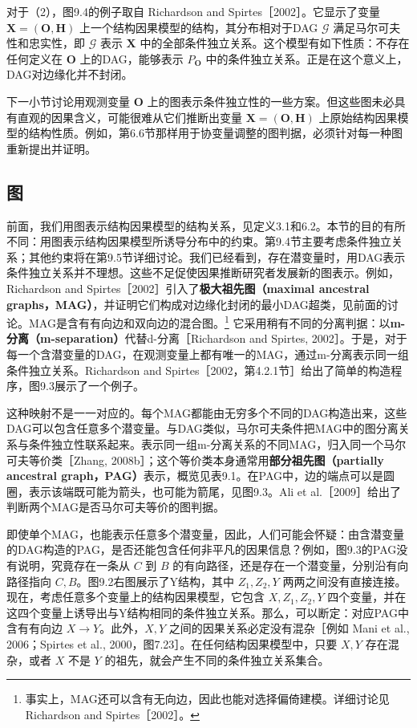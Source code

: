 


对于（2），图9.4的例子取自 Richardson and Spirtes［2002］。它显示了变量 $\mathbf X=(\mathbf O,\mathbf H)$ 上一个结构因果模型的结构，其分布相对于DAG $\mathcal G$ 满足马尔可夫性和忠实性，即 $\mathcal G$ 表示 $\mathbf X$ 中的全部条件独立关系。这个模型有如下性质：不存在任何定义在 $\mathbf O$ 上的DAG，能够表示 $P_{\mathbf O}$ 中的条件独立关系。正是在这个意义上，DAG对边缘化并不封闭。

下一小节讨论用观测变量 $\mathbf O$ 上的图表示条件独立性的一些方案。但这些图未必具有直观的因果含义，可能很难从它们推断出变量 $\mathbf X=(\mathbf O,\mathbf H)$ 上原始结构因果模型的结构性质。例如，第6.6节那样用于协变量调整的图判据，必须针对每一种图重新提出并证明。

\subsection{图}

前面，我们用图表示结构因果模型的结构关系，见定义3.1和6.2。本节的目的有所不同：用图表示结构因果模型所诱导分布中的约束。第9.4节主要考虑条件独立关系；其他约束将在第9.5节详细讨论。我们已经看到，存在潜变量时，用DAG表示条件独立关系并不理想。这些不足促使因果推断研究者发展新的图表示。例如，Richardson and Spirtes［2002］引入了\textbf{极大祖先图（maximal ancestral graphs，MAG）}，并证明它们构成对边缘化封闭的最小DAG超类，见前面的讨论。MAG是含有有向边和双向边的混合图。\footnote{事实上，MAG还可以含有无向边，因此也能对选择偏倚建模。详细讨论见 Richardson and Spirtes［2002］。}
它采用稍有不同的分离判据：以\textbf{m-分离（m-separation）}代替d-分离［Richardson and Spirtes, 2002］。于是，对于每一个含潜变量的DAG，在观测变量上都有唯一的MAG，通过m-分离表示同一组条件独立关系。Richardson and Spirtes［2002，第4.2.1节］给出了简单的构造程序，图9.3展示了一个例子。

这种映射不是一一对应的。每个MAG都能由无穷多个不同的DAG构造出来，这些DAG可以包含任意多个潜变量。与DAG类似，马尔可夫条件把MAG中的图分离关系与条件独立性联系起来。表示同一组m-分离关系的不同MAG，归入同一个马尔可夫等价类［Zhang, 2008b］；这个等价类本身通常用\textbf{部分祖先图（partially ancestral graph，PAG）}表示，概览见表9.1。在PAG中，边的端点可以是圆圈，表示该端既可能为箭头，也可能为箭尾，见图9.3。Ali et al.［2009］给出了判断两个MAG是否马尔可夫等价的图判据。



\begin{example}[Y结构]
即使单个MAG，也能表示任意多个潜变量，因此，人们可能会怀疑：由含潜变量的DAG构造的PAG，是否还能包含任何非平凡的因果信息？例如，图9.3的PAG没有说明，究竟存在一条从 $C$ 到 $B$ 的有向路径，还是存在一个潜变量，分别沿有向路径指向 $C,B$。图9.2右图展示了Y结构，其中 $Z_1,Z_2,Y$ 两两之间没有直接连接。现在，考虑任意多个变量上的结构因果模型，它包含 $X,Z_1,Z_2,Y$ 四个变量，并在这四个变量上诱导出与Y结构相同的条件独立关系。那么，可以断定：对应PAG中含有有向边 $X\to Y$。此外，$X,Y$ 之间的因果关系必定没有混杂［例如 Mani et al., 2006；Spirtes et al., 2000，图7.23］。在任何结构因果模型中，只要 $X,Y$ 存在混杂，或者 $X$ 不是 $Y$ 的祖先，就会产生不同的条件独立关系集合。
\end{example}

